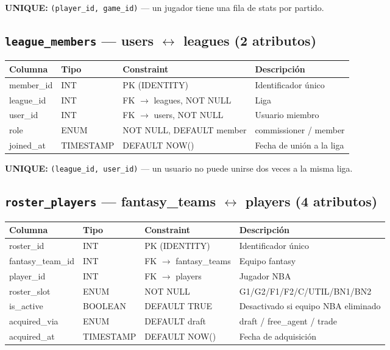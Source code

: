 \documentclass[12pt,a4paper]{article}
\begin{document}
\textbf{UNIQUE:} \texttt{(player\_id, game\_id)} --- un jugador tiene una fila de stats por partido.

\subsection{\texttt{league\_members} --- users $\leftrightarrow$ leagues (2 atributos)}
\begin{tabular}{>{\ttfamily\small}l l l p{5cm}}
\toprule
\normalfont\textbf{Columna} & \textbf{Tipo} & \textbf{Constraint} & \textbf{Descripci\'on} \\
\midrule
member\_id & INT & PK (IDENTITY) & Identificador \'unico \\
league\_id & INT & FK $\to$ leagues, NOT NULL & Liga \\
user\_id & INT & FK $\to$ users, NOT NULL & Usuario miembro \\
role & ENUM & NOT NULL, DEFAULT member & commissioner / member \\
joined\_at & TIMESTAMP & DEFAULT NOW() & Fecha de uni\'on a la liga \\
\bottomrule
\end{tabular}

\textbf{UNIQUE:} \texttt{(league\_id, user\_id)} --- un usuario no puede unirse dos veces a la misma liga.

\subsection{\texttt{roster\_players} --- fantasy\_teams $\leftrightarrow$ players (4 atributos)}
\begin{tabular}{>{\ttfamily\small}l l l p{4.5cm}}
\toprule
\normalfont\textbf{Columna} & \textbf{Tipo} & \textbf{Constraint} & \textbf{Descripci\'on} \\
\midrule
roster\_id & INT & PK (IDENTITY) & Identificador \'unico \\
fantasy\_team\_id & INT & FK $\to$ fantasy\_teams & Equipo fantasy \\
player\_id & INT & FK $\to$ players & Jugador NBA \\
roster\_slot & ENUM & NOT NULL & G1/G2/F1/F2/C/UTIL/BN1/BN2 \\
is\_active & BOOLEAN & DEFAULT TRUE & Desactivado si equipo NBA eliminado \\
acquired\_via & ENUM & DEFAULT draft & draft / free\_agent / trade \\
acquired\_at & TIMESTAMP & DEFAULT NOW() & Fecha de adquisici\'on \\
\bottomrule
\end{tabular}
\end{document}
